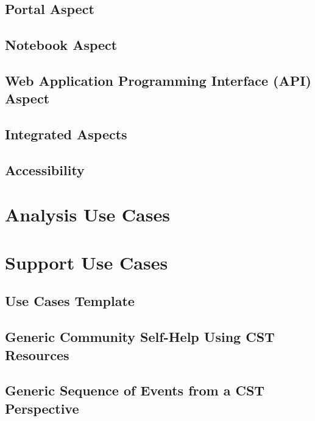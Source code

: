 \documentclass[DM,lsstdraft,authoryear,toc]{lsstdoc}
\begin{document}
\subsection{Portal Aspect}


\subsection{Notebook Aspect}


\subsection{Web Application Programming Interface (API) Aspect}


\subsection{Integrated Aspects}


\subsection{Accessibility}




\clearpage
\section{Analysis Use Cases}




\clearpage
\section{Support Use Cases}

\clearpage
\subsection{Use Cases Template}


\clearpage
\subsection{Generic Community Self-Help Using CST Resources}


\clearpage
\subsection{Generic Sequence of Events from a CST Perspective}

\end{document}
